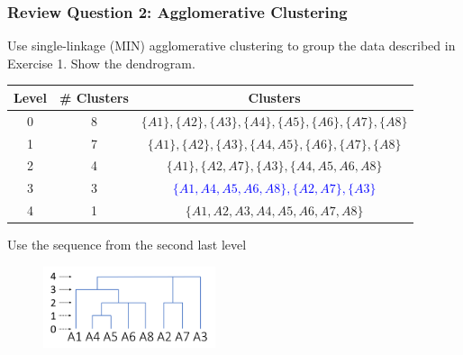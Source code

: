 \documentclass[aspectratio=169, 10pt]{beamer}
\begin{document}
\begin{frame}[t]
    \frametitle{Review Question 2: Agglomerative Clustering}
    \small
    Use single-linkage (MIN) agglomerative clustering to group the data described in Exercise 1. Show the dendrogram.

    \begin{table}[]
        \scriptsize
        \begin{tabular}{c|c|c}
        Level & \# Clusters & Clusters \\ \hline
        0     & 8           & $\{A1\}, \{A2\}, \{A3\}, \{A4\}, \{A5\}, \{A6\}, \{A7\}, \{A8\}$\\
        1     & 7           & $\{A1\}, \{A2\}, \{A3\}, \{A4, A5\}, \{A6\}, \{A7\}, \{A8\}$\\
        2     & 4           & $\{A1\}, \{A2, A7\}, \{A3\}, \{A4, A5, A6,A8\}$\\
        3     & 3           & \textcolor{blue}{$\{A1, A4, A5, A6,A8\}, \{A2, A7\}, \{A3\}$}\\
        4     & 1           & $\{A1, A2, A3, A4, A5, A6, A7, A8\}$
        \end{tabular}
    \end{table}

    Use the sequence from the second last level

    \begin{figure}
        \centering
        \includegraphics[width=0.45\textwidth]{../imgs/dendrogram.png}
    \end{figure}
\end{frame}
\end{document}

